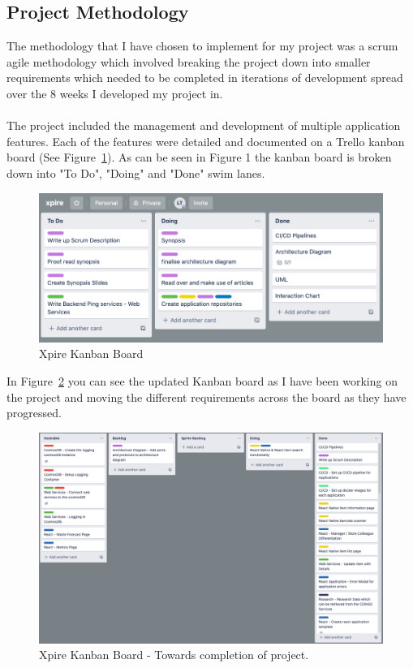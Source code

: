 \documentclass[a4paper,11pt]{report}
\begin{document}
\subsection{Project Methodology}
The methodology that I have chosen to implement for my project was a scrum agile methodology
which involved breaking the project down into smaller requirements which needed to be completed in 
iterations of development spread over the 8 weeks I developed my project in.  
\\
\\
The project included the management and development of multiple application features. Each of the features were 
detailed and documented on a Trello\cite{trello} kanban board (See Figure~\ref{fig:kanbanBoard}). 
As can be seen in Figure 1 the kanban board is broken down into "To Do", "Doing" and "Done" swim lanes.
\begin{figure}[H]
    \includegraphics[width=\linewidth]{./assets/images/Kanban-board.png}
    \caption{Xpire Kanban Board}
    \label{fig:kanbanBoard}
\end{figure}

In Figure~\ref{fig:kanbanBoardFinal} you can see the updated Kanban board as I have been working on the project and moving the different requirements across the board as they have progressed.

\begin{figure}[H]
    \includegraphics[width=\linewidth]{./assets/images/Kanban-2.png}
    \caption{Xpire Kanban Board - Towards completion of project.}
    \label{fig:kanbanBoardFinal}
\end{figure}
\end{document}
